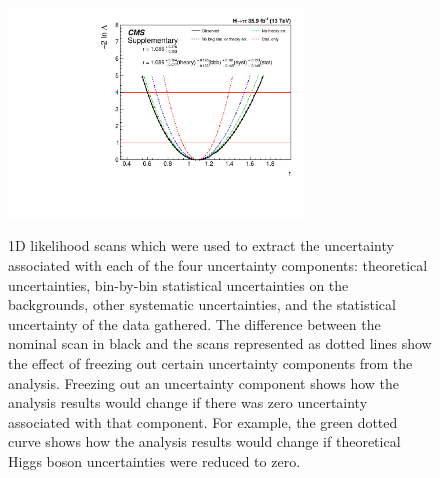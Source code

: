 \begin{figure}[htbp]
\centering
     \includegraphics[width=0.70\textwidth]{higgs_to_taus/plots/cms_output_freeze_All_Theory_bbb}\\
     \caption{
1D likelihood scans which were used to extract the uncertainty associated with each of the four uncertainty
components: theoretical uncertainties, bin-by-bin statistical uncertainties on the backgrounds, other 
systematic uncertainties, and the statistical uncertainty of the data gathered. The difference between
the nominal scan in black and the scans represented as dotted lines show the effect of freezing out certain
uncertainty components from the analysis. Freezing out an uncertainty component shows how the analysis
results would change if there was zero uncertainty associated with that component. For example, the green
dotted curve shows how the analysis results would change if theoretical Higgs boson uncertainties were
reduced to zero.
}
     \label{fig:htt_systematic_parabola}
\end{figure}



